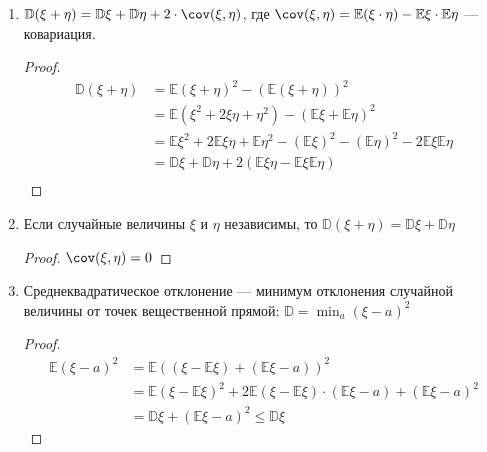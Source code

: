\begin{prop}
\begin{enumerate}
        \item \(\mathbb{D}(\xi + \eta) = \mathbb{D}\xi + \mathbb{D}\eta + 2 \cdot \cov(\xi, \eta)\), где \(\cov(\xi, \eta) = \mathbb{E}(\xi \cdot \eta) - \mathbb{E}\xi \cdot \mathbb{E} \eta\) --- ковариация.

              \begin{proof}
                  \begin{align*}
                      \mathbb{D}(\xi + \eta) & = \mathbb{E}(\xi + \eta)^2 - (\mathbb{E}(\xi + \eta))^2                                                                                 \\
                                             & = \mathbb{E}(\xi^2 + 2\xi\eta + \eta^2) - (\mathbb{E}\xi + \mathbb{E}\eta)^2                                                            \\
                                             & = \mathbb{E} \xi^2 + 2 \mathbb{E} \xi\eta + \mathbb{E} \eta^2 - (\mathbb{E} \xi)^2 - (\mathbb{E} \eta)^2 - 2\mathbb{E}\xi\mathbb{E}\eta \\
                                             & = \mathbb{D}\xi + \mathbb{D}\eta + 2 (\mathbb{E} \xi\eta - \mathbb{E}\xi\mathbb{E}\eta)                                                 \\
                  \end{align*}
              \end{proof}

        \item Если случайные величины \(\xi\) и \(\eta\) независимы, то \(\mathbb{D}(\xi + \eta) = \mathbb{D} \xi + \mathbb{D} \eta\)

              \begin{proof}
                  \(\cov(\xi, \eta) = 0\)
              \end{proof}

        \item Среднеквадратическое отклонение --- минимум отклонения случайной величины от точек вещественной прямой: \(\mathbb{D} = \min_a (\xi - a)^2\)

              \begin{proof}
                  \begin{align*}
                      \mathbb{E}(\xi - a)^2 & = \mathbb{E}((\xi - \mathbb{E}\xi) + (\mathbb{E}\xi - a))^2                                                               \\
                                            & = \mathbb{E}(\xi - \mathbb{E}\xi)^2 + 2\mathbb{E}(\xi - \mathbb{E}\xi) \cdot (\mathbb{E} \xi - a) + (\mathbb{E}\xi - a)^2 \\
                                            & = \mathbb{D}\xi + (\mathbb{E}\xi - a)^2 \leq \mathbb{D}\xi
                  \end{align*}
              \end{proof}
    \end{enumerate}
\end{prop}

